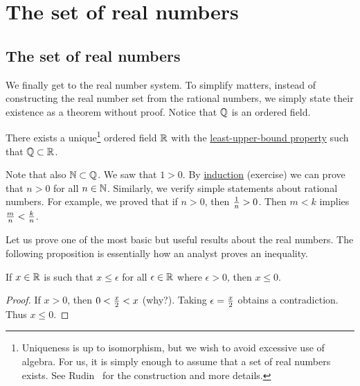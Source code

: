 
\sectionnewpage
\section{The set of real numbers} \label{sec:setofreals}


\subsection{The set of real numbers}

We finally get to the real number system.  To simplify matters, instead of constructing the
real number set from the rational numbers, we simply state their existence
as a theorem without proof.  Notice that $\Q$ is an ordered
field.

\begin{thm}
There exists a unique\footnote{Uniqueness is up to isomorphism, but we wish
to avoid excessive use of algebra.  For us, it is simply enough to assume
that a set of real numbers exists.  See Rudin~\cite{Rudin:baby} for the
construction and more details.}
ordered field $\R$ with the \hyperref[defn:lub]{least-upper-bound property}
such that $\Q \subset \R$.
\end{thm}

Note that also $\N \subset \Q$.  We saw that $1 > 0$.  By
\hyperref[induction:thm]{induction}
(exercise) we can prove that
$n > 0$ for all $n \in \N$.
Similarly, we verify simple statements about rational numbers.
For example, we proved that if $n > 0$, then $\nicefrac{1}{n} > 0$.
Then $m < k$ implies $\nicefrac{m}{n} < \nicefrac{k}{n}$.

Let us prove one of the most basic but useful results about the real numbers.
The following proposition is essentially how an analyst proves an
inequality.

\begin{prop}
If $x \in \R$ is such that $x \leq \epsilon$ for all
$\epsilon \in \R$ where
$\epsilon > 0$, then $x \leq 0$.
\end{prop}

\begin{proof}
If $x > 0$, then $0 < \nicefrac{x}{2} < x$ (why?).  Taking
$\epsilon = \nicefrac{x}{2}$ obtains a contradiction.  Thus $x \leq 0$.
\end{proof}

